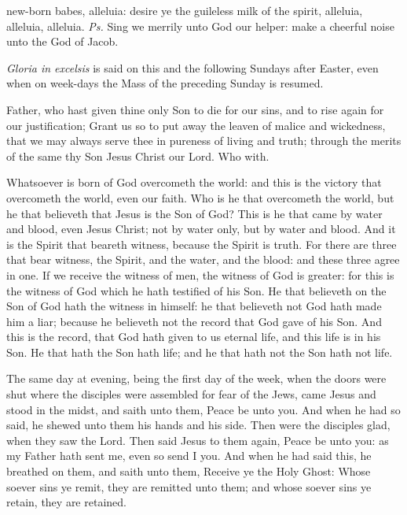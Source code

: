 
\properantiphonfix

\introit
{} new-born babes, alleluia: desire ye the guileless milk of the spirit, alleluia, alleluia, alleluia. \textit{Ps.} Sing we merrily unto God our helper: make a cheerful noise unto the God of Jacob.
\begin{rubric}
    \emph{Gloria in excelsis} is said on this and the following Sundays after Easter, even when on week-days the Mass of the preceding Sunday is resumed.
\end{rubric}
\collect
{} Father, who hast given thine only Son to die for our sins, and to rise again for our justification; Grant us so to put away the leaven of malice and wickedness, that we may always serve thee in pureness of living and truth; through the merits of the same thy Son Jesus Christ our Lord. Who with.

 Whatsoever is born of God overcometh the world: and this is the victory that overcometh the world, even our faith. Who is he that overcometh the world, but he that believeth that Jesus is the Son of God? This is he that came by water and blood, even Jesus Christ; not by water only, but by water and blood. And it is the Spirit that beareth witness, because the Spirit is truth. For there are three that bear witness, the Spirit, and the water, and the blood: and these three agree in one. If we receive the witness of men, the witness of God is greater: for this is the witness of God which he hath testified of his Son. He that believeth on the Son of God hath the witness in himself: he that believeth not God hath made him a liar; because he believeth not the record that God gave of his Son. And this is the record, that God hath given to us eternal life, and this life is in his Son. He that hath the Son hath life; and he that hath not the Son hath not life.


 The same day at evening, being the first day of the week, when the doors were shut where the disciples were assembled for fear of the Jews, came Jesus and stood in the midst, and saith unto them, Peace be unto you. And when he had so said, he shewed unto them his hands and his side. Then were the disciples glad, when they saw the Lord. Then said Jesus to them again, Peace be unto you: as my Father hath sent me, even so send I you. And when he had said this, he breathed on them, and saith unto them, Receive ye the Holy Ghost: Whose soever sins ye remit, they are remitted unto them; and whose soever sins ye retain, they are retained.


